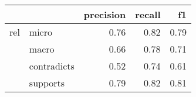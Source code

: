\begin{tabular}{llrrr}
\toprule
    &          &  precision &  recall &   f1 \\
\midrule
rel & micro &       0.76 &    0.82 & 0.79 \\
    & macro &       0.66 &    0.78 & 0.71 \\
    & contradicts &       0.52 &    0.74 & 0.61 \\
    & supports &       0.79 &    0.82 & 0.81 \\
\bottomrule
\end{tabular}
